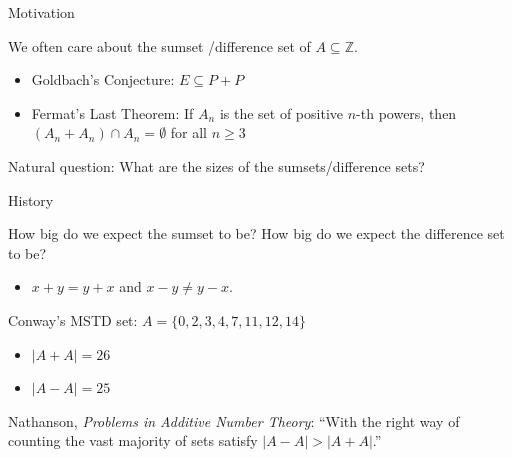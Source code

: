 \documentclass[11pt]{beamer}
\newcommand{\Z}{\mathbb{Z}}
\newcommand{\Bigskip}{\bigskip
\medskip}
\begin{document}

\begin{frame}{Motivation}

We often care about the sumset /difference set of $A\subseteq \Z$.

\pause
\Bigskip

\begin{itemize}
\item Goldbach's Conjecture: $E\subseteq P+P$ 

\pause
\Bigskip

\item Fermat's Last Theorem: If $A_n$ is the set of positive $n$-th powers, then $(A_n+A_n)\cap A_n = \emptyset$ for all $n\geq 3$
\end{itemize}

\pause
\Bigskip

Natural question: What are the sizes of the sumsets/difference sets?

\end{frame}


\begin{frame}{History}

How big do we expect the sumset to be? How big do we expect the difference set to be?

\pause
\medskip

\begin{itemize}
\item $x+y=y+x$ and $x-y\neq y-x$.
\end{itemize}

\pause
\medskip

Conway's  MSTD set: $A=\{0,2,3,4,7,11,12,14\}$ \pause
\begin{itemize}

\item $|A+A|=26$
\item $|A-A|=25$
\end{itemize}
\pause

\medskip

\alert{Nathanson}, \emph{Problems in Additive Number Theory}: ``With the right way of counting the vast majority of sets satisfy $|A-A|>|A+A|$.''
\end{frame}
\end{document}
